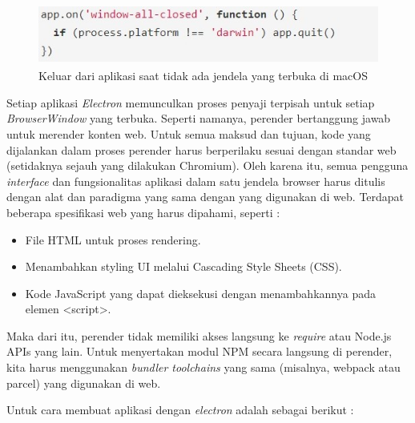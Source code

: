 \begin{figure}[H]
    \centering
    \includegraphics[width=12cm, height=2cm]{Gambar/lifecycle.jpg}
    \caption{Keluar dari aplikasi saat tidak ada jendela yang terbuka di macOS}
    \label{fig:gambarLifecycle}
\end{figure}

Setiap aplikasi \textit{Electron} memunculkan proses penyaji terpisah untuk setiap \textit{BrowserWindow} yang terbuka. Seperti namanya, perender bertanggung jawab untuk merender konten web. Untuk semua maksud dan tujuan, kode yang dijalankan dalam proses perender harus berperilaku sesuai dengan standar web (setidaknya sejauh yang dilakukan Chromium). Oleh karena itu, semua pengguna \textit{interface} dan fungsionalitas aplikasi dalam satu jendela browser harus ditulis dengan alat dan paradigma yang sama dengan yang digunakan di web. Terdapat beberapa spesifikasi web yang harus dipahami, seperti :

\begin{itemize}
    \item File HTML untuk proses rendering.
    \item Menambahkan styling UI melalui Cascading Style Sheets (CSS).
    \item Kode JavaScript yang dapat dieksekusi dengan menambahkannya pada elemen <script>.
\end{itemize}

Maka dari itu, perender tidak memiliki akses langsung ke \textit{require} atau Node.js APIs yang lain. Untuk menyertakan modul NPM secara langsung di perender, kita harus menggunakan \textit{bundler toolchains} yang sama (misalnya, webpack atau parcel) yang digunakan di web.

Untuk cara membuat aplikasi dengan \textit{electron} adalah sebagai berikut :

